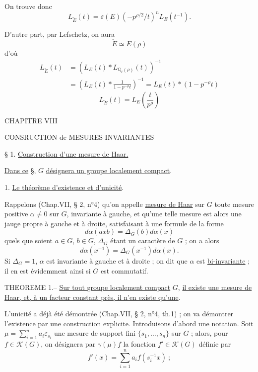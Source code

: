 On trouve donc
\[
L_{\check E}(t)=\varepsilon(E)(-p^{\rho/2}/t)^n L_E(t^{-1}).
\]

D'autre part, par Lefschetz, on aura
\[
\check E\simeq E(\rho)
\]
d'où
\[
\begin{aligned}
L_{\check E}(t)&=\left(L_E(t)*L_{\mathbb{Q}_{\ell}(\rho)}(t)\right)^{-1}\\
&=\left(L_E(t)*\frac{1}{1-p^{-\rho}t}\right)^{-1}=L_E(t)*(1-p^{-\rho}t)
\end{aligned}
\]
\[
L_{\check E}(t)=L_E\left(\frac{t}{p^{\rho}}\right)
\]


\begin{center}
CHAPITRE VIII

CONSRUCTION de MESURES INVARIANTES

§ 1. \uline{Construction d'une mesure de Haar.}
\end{center}

\uline{Dans ce} §, $G$ \uline{désignera un groupe localement compact}.

1. \uline{Le théorème d'existence et d'unicité}.

Rappelons (Chap.VII, § 2, n°4) qu'on appelle \uline{mesure de Haar} sur $G$ toute mesure positive $\alpha\neq0$ sur $G$, invariante à gauche, et qu'une telle mesure est alors une jauge propre à gauche et à droite, satisfaisant à une formule de la forme
\[
d\alpha(axb)=\Delta_G(b)d\alpha(x)
\]
quels que soient $a\in G$, $b\in G$, $\Delta_G$ étant un caractère de $G$ ; on a alors
\[
d\alpha(x^{-1})=\Delta_G(x^{-1})d\alpha(x).
\]
Si $\Delta_G=1$, $\alpha$ est invariante à gauche et à droite ; on dit que $\alpha$ est \uline{bi-invariante} ; il en est évidemment ainsi si $G$ est commutatif.

THEOREME 1.-- \uline{Sur tout groupe localement compact} $G$, \uline{il existe une mesure de Haar, et, à un facteur constant près, il n'en existe qu'une}.

L'unicité a déjà été démontrée (Chap.VII, § 2, n°4, th.1) ; on va démontrer l'existence par une construction explicite. Introduisons d'abord une notation. Soit $\mu=\sum_{i=1}^{n}a_i\varepsilon_{s_i}$ une mesure de support fini $\{s_1,\ldots,s_n\}$ sur $G$ ; alors, pour $f\in\mathcal{K}(G)$, on désignera par $\gamma(\mu)f$ la fonction $f'\in\mathcal{K}(G)$ définie par
\[
f'(x)=\sum_{i=1}^{n}a_i f(s_i^{-1}x)\ ;
\]

